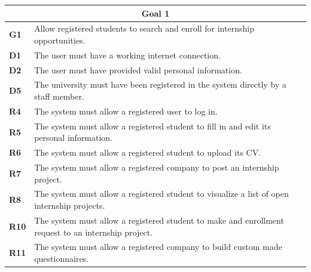 \begin{table}[H]
    \centering
    \begin{tabular}{|l|m{10cm}|}
        \hline \multicolumn{2}{|c|}{\textbf{Goal 1}} \\
        \hline \textbf{G1} & Allow registered students to search and enroll for internship opportunities. \\
        \hline \textbf{D1} & The user must have a working internet connection. \\
        \hline \textbf{D2} & The user must have provided valid personal information. \\
        \hline \textbf{D5} & The university must have been registered in the system directly by a staff member. \\
        \hline \textbf{R4} & The system must allow a registered user to log in. \\
        \hline \textbf{R5} & The system must allow a registered student to fill in and edit its personal information. \\
        \hline \textbf{R6} & The system must allow a registered student to upload its CV. \\
        \hline \textbf{R7} & The system must allow a registered company to post an internship project. \\
        \hline \textbf{R8} & The system must allow a registered student to visualize a list of open internship projects. \\
        \hline \textbf{R10} & The system must allow a registered student to make and enrollment request to an internship project. \\
        \hline \textbf{R11} & The system must allow a registered company to build custom made questionnaires. \\

\end{tabular}
\end{table}
